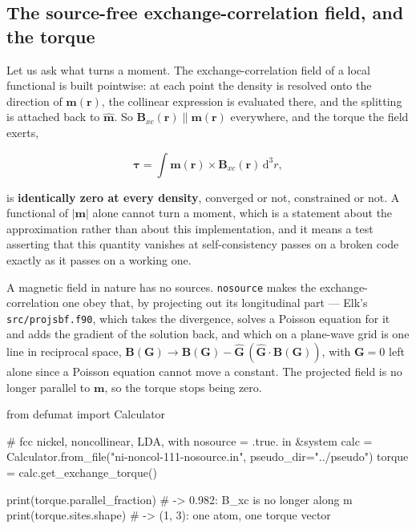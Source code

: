 \documentclass[11pt,a4paper]{article}
\newcommand{\code}[1]{\texttt{\small #1}}
\begin{document}
\subsection{The source-free exchange-correlation field, and the torque}

Let us ask what turns a moment. The exchange-correlation field of a local
functional is built pointwise: at each point the density is resolved onto the
direction of $\mathbf m(\mathbf r)$, the collinear expression is evaluated
there, and the splitting is attached back to $\hat{\mathbf m}$. So
$\mathbf B_{xc}(\mathbf r) \parallel \mathbf m(\mathbf r)$ everywhere, and the
torque the field exerts,

\begin{equation*}
\boldsymbol\tau = \int \mathbf m(\mathbf r)\times\mathbf B_{xc}(\mathbf r)\,
\mathrm d^3 r,
\end{equation*}

is \textbf{identically zero at every density}, converged or not, constrained or
not. A functional of $|\mathbf m|$ alone cannot turn a moment, which is a
statement about the approximation rather than about this implementation, and it
means a test asserting that this quantity vanishes at self-consistency passes on
a broken code exactly as it passes on a working one.

A magnetic field in nature has no sources. \code{nosource} makes the
exchange-correlation one obey that, by projecting out its longitudinal part ---
Elk's \code{src/projsbf.f90}, which takes the divergence, solves a Poisson
equation for it and adds the gradient of the solution back, and which on a
plane-wave grid is one line in reciprocal space,
$\mathbf B(\mathbf G) \to \mathbf B(\mathbf G) - \hat{\mathbf G}\,
(\hat{\mathbf G}\cdot\mathbf B(\mathbf G))$, with $\mathbf G = 0$ left alone
since a Poisson equation cannot move a constant. The projected field is no
longer parallel to $\mathbf m$, so the torque stops being zero.

\begin{pycode}
from defumat import Calculator

# fcc nickel, noncollinear, LDA, with nosource = .true. in &system
calc = Calculator.from_file("ni-noncol-111-nosource.in", pseudo_dir="../pseudo")
torque = calc.get_exchange_torque()

print(torque.parallel_fraction)   # -> 0.982: B_xc is no longer along m
print(torque.sites.shape)         # -> (1, 3): one atom, one torque vector
\end{pycode}
\end{document}
